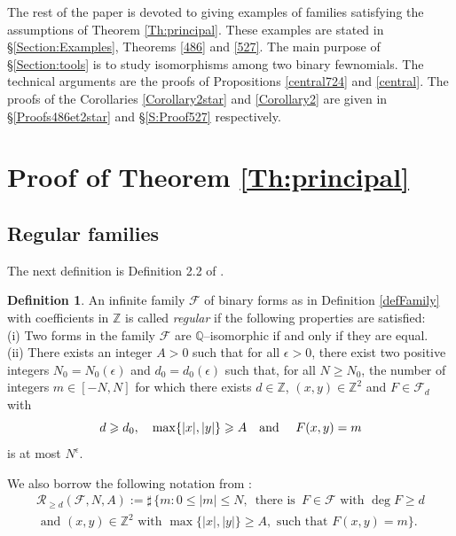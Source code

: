 \documentclass[10pt]{article}
\theoremstyle{definition}
\newtheorem{definition}[theorem]{Definition}
\numberwithin{equation}{section}
\newcommand {\Q}{{\mathbb{Q}}}
\newcommand {\Z}{{\mathbb{Z}}}
\newcommand{\calF}{\mathcal {F}}
\newcommand{\calR}{\mathcal {R}}
\begin{document}
 The rest of the paper is devoted to giving examples of families satisfying the assumptions of Theorem \ref{Th:principal}. These examples are stated in \S \ref{Section:Examples}, Theorems \ref{486} and \ref{527}. The main purpose of \S \ref{Section:tools} is to study isomorphisms among two binary fewnomials. The technical arguments are the proofs of Propositions \ref{central724} and \ref{central}. The proofs of the Corollaries \ref{Corollary2star} and \ref{Corollary2} are given in \S \ref{Proofs486et2star} and \S \ref{S:Proof527} respectively.
 
 \section{Proof of Theorem \ref{Th:principal}}\label{Section:ProofPrincipal}
 
 
\subsection{Regular families}

The next definition is Definition 2.2 of \cite{FW2}. 

\begin{definition}\label{def:Regular}
An infinite family $\mathcal F$ of binary forms as in Definition \ref{defFamily} with coefficients in $\Z$ is called {\em regular} if the following properties are satisfied:
\\
(i) Two forms in the family $\mathcal F$ are $\Q$--isomorphic if and only if they are equal. 
\\
(ii) There exists an integer $A>0$ such that for all $\epsilon>0$, there exist two positive integers $N_0=N_0(\epsilon)$ and $d_0=d_0(\epsilon)$ such that, for all $N\geqslant N_0$, the number of integers $m\in [-N,N]$ for which there exists $d\in\Z$, $(x,y) \in \Z^2$ and $F\in \calF_d$ with
\[
d\geqslant d_0,\quad 
 \max\{\vert x\vert, \vert y \vert\} \geqslant A\quad\hbox{and }\quad F(x,y)=m
\] 
is at most $N^\epsilon$. 
\end{definition}

We also borrow the following notation from \cite{FW2}:
\[
 \begin{aligned}
{\calR}_{\geqslant d} \left (\calF, N, A\right) := \sharp\, \bigl\{ m: 0\leqslant \vert m \vert \leqslant N, \, \text{ there is } \, F\in \calF \text{ with } \deg F \geqslant d
\\
\text{ and } (x,y)\in \Z^2 \text{ with } \max \{\vert x \vert, \vert y \vert\} \geqslant A, \text{ such that } F(x,y) =m
\bigr\}. 
\end{aligned}
\]
\end{document}
